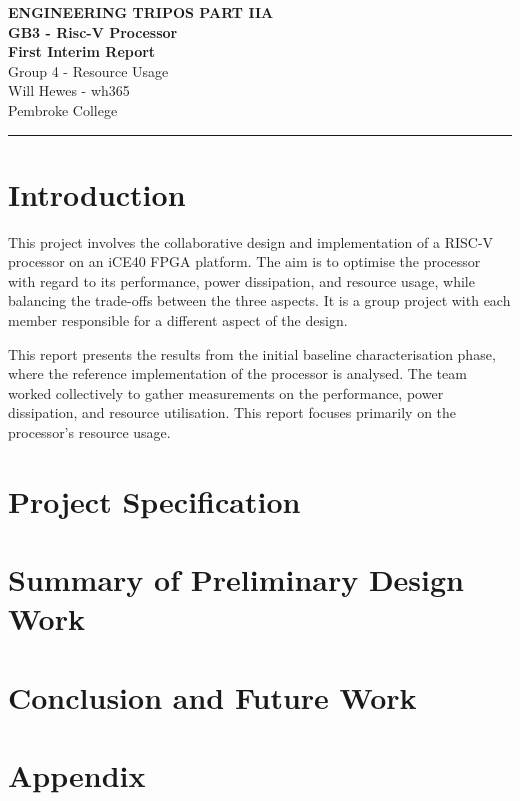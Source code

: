 \documentclass[a4paper,10pt]{article}
\renewcommand{\maketitle}{
    \begin{center}
        \LARGE \textbf{ENGINEERING TRIPOS PART IIA} \\ 
        \vspace{0.5em}
        \Large \textbf{GB3 - Risc-V Processor} \\ 
        \vspace{0.5em}
        \textbf{First Interim Report} \\
        \large Group 4 - Resource Usage \\
        \vspace{1em}
        \large Will Hewes - wh365 \\ 
        Pembroke College \\ 
        \vspace{0.5em}
    \end{center}
}
\begin{document}
\maketitle
\hrule
\tableofcontents
\newpage

\section{Introduction}
\label{sec:Introduction}

This project involves the collaborative design and implementation 
of a RISC-V processor on an iCE40 FPGA platform. 
The aim is to optimise the processor with regard to its
performance, power dissipation, and resource usage, 
while balancing the trade-offs between the three aspects. 
It is a group project with each member responsible 
for a different aspect of the design.

This report presents the results from the initial baseline characterisation phase, 
where the reference implementation of the processor is analysed. 
The team worked collectively to gather measurements on the
performance, power dissipation, and resource utilisation. 
This report focuses primarily on the processor's resource usage.


\section{Project Specification}
\label{sec:Project_Specification}

\section{Summary of Preliminary Design Work}
\label{sec:Summary_of_Preliminary_Design_Work}

\section{Conclusion and Future Work}
\label{sec:Conclusion_and_Future_Work}

\appendix
\section{Appendix}
\end{document}
